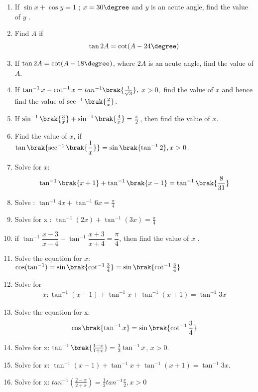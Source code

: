 \begin{enumerate}[label=\thesubsection.\arabic*.,ref=\thesubsection.\theenumi]
\hfill{}
\item If $\sin{x} + \cos{y}= 1$ ; $x=30\degree$  and  $y$ is an acute angle, find the value of $y$ .

\hfill{}
\item Find $A$ if \begin{align*}\tan 2A = \cot (A-24\degree)\end{align*}
  \hfill{}
\item If $\tan2A = \cot(A-18\degree)$, where $2A$ is an acute angle, find the value of $A$.

\hfill{}
\item If $\tan^{-1}{x} - \cot^{-1} {x}= tan^{-1}\brak{\frac{1}{\sqrt{3}}},$ $x > 0,$ find the value of $x$ and hence find the value of $\sec^{-1}\brak{\frac{2}{x}}$.
 \hfill{}\item If $\sin^{-1}\brak{\frac{3}{x}} + \sin^{-1}\brak{\frac{4}{x}} = \frac{\pi}{2}$, then find the value of $x$.
 \hfill{}\item Find  the value of $x$, if $\tan\brak{\sec^{-1}\brak{\dfrac{1}{x}}}  = \sin \brak{\tan^{-1}{2}},x>0$.

\hfill{}
\item Solve for $x$:
	\begin{align*}
	\tan^{-1}\brak{x+1}+\tan^{-1}\brak{x-1}=\tan^{-1}\brak{\dfrac{8}{31}}
	\end{align*}
\hfill{}
\item Solve : $\tan^{-1}4x+\tan^{-1}6x=\frac{\pi}{4}$
\hfill{}
\item Solve for x :  $\tan^{-1}(2x)+\tan^{-1}(3x)=\frac{\pi}{4}$
\hfill{}

\item if $\tan^{-1}\dfrac{x-3}{x-4} + \tan^{-1}\dfrac{x+3}{x+4} =\dfrac{\pi}{4}$, then find the value of $x$ .
\hfill{}
\item Solve the equation for $x$: $\cos (\tan^{-1}) = \sin \brak{\cot^{-1} \frac{3}{4}} = \sin \brak{\cot^{-1} \frac{3}{4}}$

	
	\hfill{}\item Solve for 
	\begin{align*}
		x: \tan^{-1}(x-1) + \tan^{-1}x + \tan^{-1}(x+1) = \tan^{-1}3x
	\end{align*}

	\hfill{}
\item Solve the equation for x:
	\begin{align*}
	\cos\brak{\tan^{-1}x} = \sin\brak{\cot^{-1}\frac{3}{4}}
	\end{align*}
\hfill{}
\item Solve for x: $\tan^{-1}\brak{\frac{1-x}{1+x}} = \frac{1}{2}\tan^{-1}x$, $x>0$. 
\hfill{}
\item Solve for $x$: $\tan^{-1}(x-1) + \tan^{-1}x + \tan^{-1}(x+1) = \tan^{-1}3x$.
\hfill{}
\item Solve for x: $tan^{-1}(\frac{2-x}{2+x}) = \frac{1}{2} tan^{-1}\frac{x}{2},x>0$
\hfill{}

\end{enumerate}
